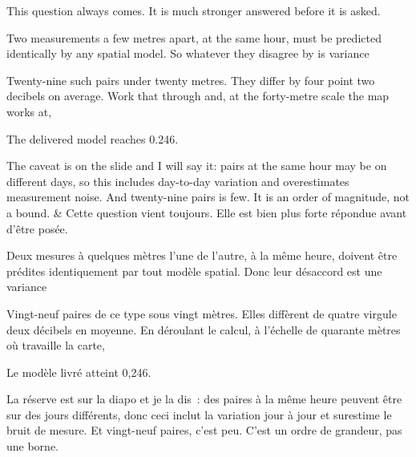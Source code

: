 \documentclass[10pt,a4paper]{article}
\begin{document}
\begin{say}
This question always comes. It is much stronger answered before it is asked.

Two measurements a few metres apart, at the same hour, must be predicted
identically by any spatial model. So whatever they disagree by is variance

Twenty-nine such pairs under twenty metres. They differ by four point two
decibels on average. Work that through and, at the forty-metre scale the map
works at, 

The delivered model reaches 0.246. 

The caveat is on the slide and I will say it: pairs at the same hour may be on
different days, so this includes day-to-day variation and overestimates
measurement noise. And twenty-nine pairs is few. It is an order of magnitude, not
a bound.
&
Cette question vient toujours. Elle est bien plus forte répondue avant d'être
posée.

Deux mesures à quelques mètres l'une de l'autre, à la même heure, doivent être
prédites identiquement par tout modèle spatial. Donc leur désaccord est une
variance 

Vingt-neuf paires de ce type sous vingt mètres. Elles diffèrent de quatre virgule
deux décibels en moyenne. En déroulant le calcul, à l'échelle de quarante mètres
où travaille la carte, 

Le modèle livré atteint 0,246. 

La réserve est sur la diapo et je la dis~: des paires à la même heure peuvent être
sur des jours différents, donc ceci inclut la variation jour à jour et surestime
le bruit de mesure. Et vingt-neuf paires, c'est peu. C'est un ordre de grandeur,
pas une borne.
\end{say}
\end{document}
